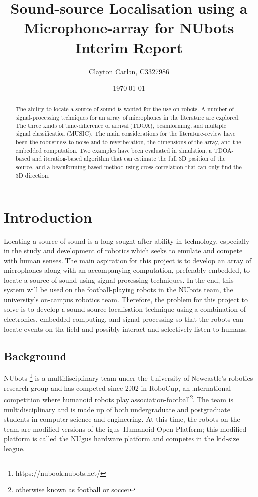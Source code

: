 \documentclass{report}
\title{
	Sound-source Localisation using a Microphone-array for NUbots\\
	Interim Report
}
\author{Clayton Carlon, C3327986}
\date{\today}
\begin{document}
\begin{titlepage}
\maketitle
\begin{abstract}
The ability to locate a source of sound is wanted for the use on robots. A number of signal-processing techniques for an array of microphones in the literature are explored. The three kinds of time-difference of arrival (TDOA), beamforming, and multiple signal classification (MUSIC). The main considerations for the literature-review have been the robustness to noise and to reverberation, the dimensions of the array, and the embedded computation. Two examples have been evaluated in simulation, a TDOA-based and iteration-based algorithm that can estimate the full 3D position of the source, and a beamforming-based method using cross-correlation that can only find the 3D direction.
\end{abstract}
\end{titlepage}

\tableofcontents

\chapter{Introduction}

Locating a source of sound is a long sought after ability in technology, especially in the study and development of robotics which seeks to emulate and compete with human senses. The main aspiration for this project is to develop an array of microphones along with an accompanying computation, preferably embedded, to locate a source of sound using signal-processing techniques. In the end, this system will be used on the football-playing robots in the NUbots team, the university's on-campus robotics team. Therefore, the problem for this project to solve is to develop a sound-source-localisation technique using a combination of electronics, embedded computing, and signal-processing so that the robots can locate events on the field and possibly interact and selectively listen to humans.

\section{Background}

NUbots \footnote{https://nubook.nubots.net/} is a multidisciplinary team under the University of Newcastle's robotics research group and has competed since 2002 in RoboCup, an international competition where humanoid robots play association-football\footnote{otherwise known as football or soccer}. The team is multidisciplinary and is made up of both undergraduate and postgraduate students in computer science and engineering. At this time, the robots on the team are modified versions of the igus\textregistered\ Humanoid Open Platform; this modified platform is called the NUgus hardware platform and competes in the kid-size league.
\end{document}
